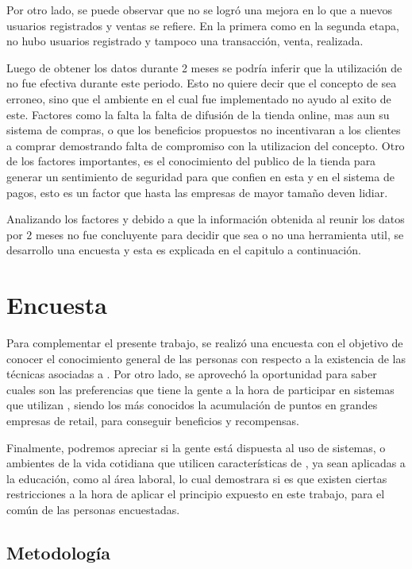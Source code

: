 Por otro lado, se puede observar que no se logró una mejora en lo que a nuevos
usuarios registrados y ventas se refiere.
En la primera como en la segunda etapa, no hubo usuarios registrado y tampoco
una transacción, venta, realizada.

Luego de obtener los datos durante 2 meses se podría inferir que la utilización
de {\GAM} no fue efectiva durante este periodo. Esto no quiere decir que el concepto
de {\GAM} sea erroneo, sino que el ambiente en el cual fue implementado no ayudo
al exito de este. Factores como la falta la falta de difusión de la tienda online,
 mas aun su sistema de compras, o que los beneficios propuestos no incentivaran a
 los clientes a comprar demostrando falta de compromiso con la utilizacion del
concepto. Otro de los factores importantes, es el conocimiento del publico de la tienda 
para generar un sentimiento de seguridad para que confien en esta y en el sistema de pagos, 
esto es un factor que hasta las empresas de mayor tamaño deven lidiar.

Analizando los factores y debido a que la información obtenida al reunir los datos por $2$
 meses no fue concluyente para decidir que {\GAM} sea o no una herramienta util, se
desarrollo una encuesta y esta es explicada en el capitulo a continuación.

\section{Encuesta}

Para complementar el presente trabajo, se realizó una encuesta con el objetivo de
conocer el conocimiento general de las personas con respecto a la existencia
de las técnicas asociadas a {\GAM}.
Por otro lado, se aprovechó la oportunidad para saber cuales son las preferencias
que tiene la gente a la hora de participar en sistemas que utilizan {\GAM},
siendo los más conocidos la acumulación de puntos en grandes empresas de retail,
para conseguir beneficios y recompensas.

Finalmente, podremos apreciar si la gente está dispuesta al uso de sistemas,
o ambientes de la vida cotidiana que utilicen características de {\GAM},
ya sean aplicadas a la educación, como al área laboral, lo cual demostrara
 si es que existen ciertas restricciones a la hora de aplicar
el principio expuesto en este trabajo, para el común de las personas
encuestadas.

\subsection{Metodología}

